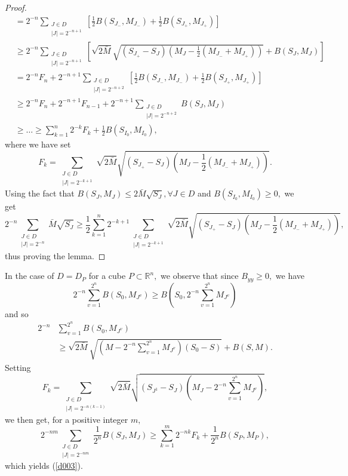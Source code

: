 \documentclass[psamsfonts]{conm-p-l}
\theoremstyle{definition}
\theoremstyle{remark}
\numberwithin{equation}{section}
\begin{document}
\begin{proof}
\begin{align*}
&=2^{-n}
\!\!\!\!\!\!\sum_
{\substack{ 
J\in D\\
|J|=2^{{-n+1}} 
}}
\left[\frac12B(S_{J_-},M_{J_-})+\frac12B(S_{J_+},M_{J_+})\right]\\
&\ge 2^{-n}\!\!\!\!\!\!\sum_
{\substack{ 
J\in D\\
|J|=2^{{-n+1}} 
}}
\left[\sqrt{2\bar{M}}\sqrt{(S_{J_+}-S_J)\left(M_J-\frac12(M_{J_-}+M_{J_+})\right)}+B(S_J,M_J)\right]\\
&=2^{-n}F_n+2^{-n+1}
\!\!\!\!\!\!\sum_
{\substack{ 
J\in D\\
|J|=2^{-n+2} 
}}
\left[\frac12B(S_{J_-},M_{J_-})+\frac12B(S_{J_+},M_{J_+})\right]\\
&\ge 2^{-n}F_n+2^{-n+1}F_{n-1}+2^{-n+1}
\!\!\!\!\!\!\sum_
{\substack{ 
J\in D\\
|J|=2^{-n+2} 
}}
B(S_J,M_J)\\
&\ge\dots\ge\sum_{k=1}^n2^{-k}F_k+\frac12 B(S_{I_0},M_{I_0}),
\end{align*}
where we have set
$$
F_k=
\sum_
{\substack{ 
J\in D\\
|J|=2^{-k+1} 
}}
\sqrt{2\bar{M}}\sqrt{(S_{J_+}-S_J)\left(M_J-\frac12(M_{J_-}+M_{J_+})\right)}.
$$
Using the fact that $B(S_J,M_J)\le 2\bar{M}\sqrt{S_J},\forall J\in D$ and $B(S_{I_0},M_{I_0})\ge 0,$ we get
$$
2^{-n}\!\!\!\!
\sum_
{\substack{ 
J\in D\\
|J|=2^{{-n}} 
}}
\bar{M}\sqrt{S_J}\ge\frac12\sum_{k=1}^n 2^{-k+1}\!\!\!\!\!\!
\sum_
{\substack{ 
J\in D\\
|J|=2^{-k+1} 
}}
\sqrt{2\bar{M}}\sqrt{(S_{J_+}-S_J)\left(M_J-\frac12(M_{J_-}+M_{J_+})\right)},
$$
thus proving the lemma.
\end{proof}
In the case of $D=D_P$ for a cube $P\subset\mathbb{R}^n,$ we observe that since $B_{yy}\ge0,$ we have
$$
2^{-n}\sum_{v=1}^{2^n}B(S_0,M_{J^v})\ge B\left(S_0,2^{-n}\sum_{v=1}^{2^n}M_{J^v}\right)
$$
and so
\begin{align*}
2^{-n}&\sum_{v=1}^{2^n}B(S_0,M_{J^v})\\
&\ge\sqrt{2\bar{M}}\sqrt{\left(M-2^{-n}\sum_{v=1}^{2^n}M_{J^v}\right)(S_0-S)}+B(S,M).
\end{align*}
Setting
$$
F_k=
\sum_
{\substack{ 
J\in D\\
|J|=2^{-n(k-1)} 
}}
\sqrt{2\bar{M}}\sqrt{(S_{J^1}-S_J)\left(M_J-2^{-n}\sum_{v=1}^{2^n}M_{J^v}\right)},
$$
we then get, for a positive integer $m,$
$$
2^{-nm}
\sum_
{\substack{ 
J\in D\\
|J|=2^{{-nm}} 
}}
\frac1{2^n}B(S_J,M_J)\ge\sum_{k=1}^m 2^{-nk}F_k+\frac1{2^n}B(S_P,M_P),
$$
which yields (\ref{d003}).
\end{document}
